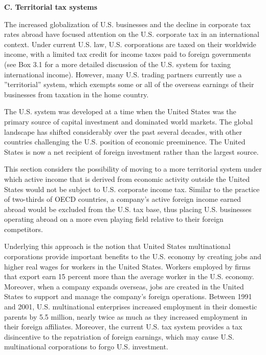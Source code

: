 \begin{select}

\begin{center}
\textbf{C. Territorial tax systems}
\end{center}  
 
The increased globalization of U.S. businesses and the decline in corporate tax 
rates abroad have focused attention on the U.S. corporate tax in an international context.  
Under current U.S. law, U.S. corporations are taxed on their worldwide income, with a 
limited tax credit for income taxes paid to foreign governments (see Box 3.1 for a more 
detailed discussion of the U.S. system for taxing international income).  However, many 
U.S. trading partners currently use a ''territorial'' system, which exempts some or all of 
the overseas earnings of their businesses from taxation in the home country. 
   
The U.S. system was developed at a time when the United States was the primary 
source of capital investment and dominated world markets.  The global landscape has 
shifted considerably over the past several decades, with other countries challenging the 
U.S. position of economic preeminence.  The United States is now a net recipient of 
foreign investment rather than the largest source.   
 
This section considers the possibility of moving to a more territorial system under 
which active income that is derived from economic activity outside the United States 
would not be subject to U.S. corporate income tax.  Similar to the practice of two-thirds 
of OECD countries, a company's active foreign income earned abroad would be excluded 
from the U.S. tax base, thus placing U.S. businesses operating abroad on a more even 
playing field relative to their foreign competitors.  
 
Underlying this approach is the notion that United States multinational corporations 
provide important benefits to the U.S. economy by creating jobs and higher real wages 
for workers in the United States.  Workers employed by firms that export earn 15 percent 
more than the average worker in the U.S. economy. Moreover, when a company 
expands overseas, jobs are created in the United States to support and manage the 
company's foreign operations.  Between 1991 and 2001, U.S. multinational enterprises 
increased employment in their domestic parents by 5.5 million, nearly twice as much as 
they increased employment in their foreign affiliates.  Moreover, the current U.S. tax 
system provides a tax disincentive to the repatriation of foreign earnings, which may 
cause U.S. multinational corporations to forgo U.S. investment. 


\end{select}
